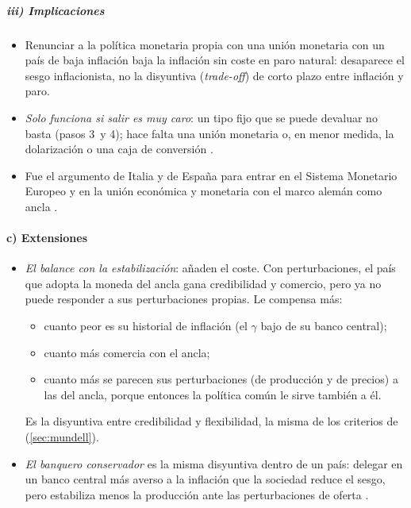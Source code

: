 \documentclass[11pt]{article}
\begin{document}
\subparagraph{iii) Implicaciones}

\begin{itemize}
\item Renunciar a la política monetaria propia con una unión monetaria con un país de baja inflación baja la inflación sin coste en paro natural: desaparece el sesgo inflacionista, no la disyuntiva (\emph{trade-off}) de corto plazo entre inflación y paro.
\item \emph{Solo funciona si salir es muy caro}: un tipo fijo que se puede devaluar no basta (pasos 3~y 4); hace falta una unión monetaria o, en menor medida, la dolarización o una caja de conversión .
\item Fue el argumento de Italia y de España para entrar en el Sistema Monetario Europeo y en la unión económica y monetaria con el marco alemán como ancla .
\end{itemize}

\paragraph{c) Extensiones}

\begin{itemize}
\item \emph{El balance con la estabilización}: \textcite{AlesinaBarro2002} añaden el coste. Con perturbaciones, el país que adopta la moneda del ancla gana credibilidad y comercio, pero ya no puede responder a sus perturbaciones propias. Le compensa más:
  \begin{itemize}
  \item cuanto peor es su historial de inflación (el $\gamma$ bajo de su banco central);
  \item cuanto más comercia con el ancla;
  \item cuanto más se parecen sus perturbaciones (de producción y de precios) a las del ancla, porque entonces la política común le sirve también a él.
  \end{itemize}
  Es la disyuntiva entre credibilidad y flexibilidad, la misma de los criterios de  (\ref{sec:mundell}).
\item \emph{El banquero conservador} es la misma disyuntiva dentro de un país: delegar en un banco central más averso a la inflación que la sociedad reduce el sesgo, pero estabiliza menos la producción ante las perturbaciones de oferta\nocite{Rogoff1985Optimal} .
\end{itemize}
\end{document}
